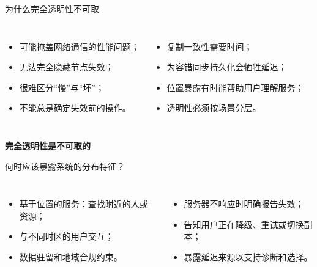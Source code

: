 \documentclass[UTF8,fontset=none,aspectratio=169,10pt]{beamer}
\begin{document}
\begin{frame}{为什么完全透明性不可取}
\begin{columns}[T,onlytextwidth]
\begin{itemize}\item 可能掩盖网络通信的性能问题；\item 无法完全隐藏节点失效；\item 很难区分“慢”与“坏”；\item 不能总是确定失效前的操作。\end{itemize}
\begin{itemize}\item 复制一致性需要时间；\item 为容错同步持久化会牺牲延迟；\item 位置暴露有时能帮助用户理解服务；\item 透明性必须按场景分层。\end{itemize}\end{columns}
\vfill\begin{center}\Large\color{ADSOrange}\bfseries 完全透明性是不可取的\end{center}
\end{frame}

\begin{frame}{何时应该暴露系统的分布特征？}
\begin{columns}[T,onlytextwidth]
\begin{itemize}
  \item 基于位置的服务：查找附近的人或资源；
  \item 与不同时区的用户交互；
  \item 数据驻留和地域合规约束。
\end{itemize}
\begin{itemize}
  \item 服务器不响应时明确报告失效；
  \item 告知用户正在降级、重试或切换副本；
  \item 暴露延迟来源以支持诊断和选择。
\end{itemize}
\end{columns}
\vfill
{}
\end{frame}
\end{document}
